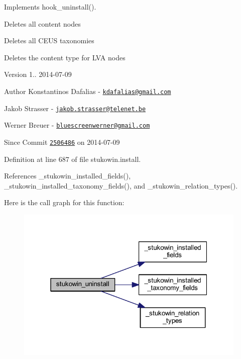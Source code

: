 Implements hook\+\_\+uninstall(). 


\begin{DoxyItemize}
\item Deletes all content nodes
\item Deletes all C\+E\+U\+S taxonomies
\item Deletes the content type for L\+V\+A nodes
\end{DoxyItemize}

\begin{DoxyVersion}{Version}
1.. 2014-\/07-\/09 
\end{DoxyVersion}
\begin{DoxyAuthor}{Author}
Konstantinos Dafalias -\/ \href{mailto:kdafalias@gmail.com}{\tt kdafalias@gmail.\+com} 

Jakob Strasser -\/ \href{mailto:jakob.strasser@telenet.be}{\tt jakob.\+strasser@telenet.\+be} 

Werner Breuer -\/ \href{mailto:bluescreenwerner@gmail.com}{\tt bluescreenwerner@gmail.\+com}
\end{DoxyAuthor}
\begin{DoxySince}{Since}
Commit \href{http://github.com/TheJake123/DrupalModul/commit/2506486a98691dbd0031666d5f932784bd3eede1}{\tt 2506486} on 2014-\/07-\/09 
\end{DoxySince}


Definition at line 687 of file stukowin.\+install.



References \+\_\+stukowin\+\_\+installed\+\_\+fields(), \+\_\+stukowin\+\_\+installed\+\_\+taxonomy\+\_\+fields(), and \+\_\+stukowin\+\_\+relation\+\_\+types().



Here is the call graph for this function\+:
\nopagebreak
\begin{figure}[H]
\begin{center}
\leavevmode
\includegraphics[width=313pt]{group___stukowin___module_gad831696eae7eb1a0e48c4e9621323bca_cgraph}
\end{center}
\end{figure}


